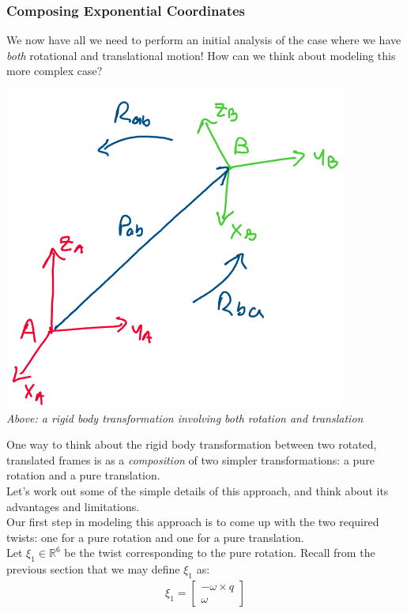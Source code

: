 \documentclass[oneside]{book}
\begin{document}
\subsubsection{Composing Exponential Coordinates}
We now have all we need to perform an initial analysis of the case where we have \textit{both} rotational and translational motion! How can we think about modeling this more complex case?
\begin{center}
    \includegraphics[scale=0.4]{images/general_rb_transf.png}\\
    \textit{Above: a rigid body transformation involving both rotation and translation}
\end{center}
One way to think about the rigid body transformation between two rotated, translated frames is as a \textit{composition} of two simpler transformations: a pure rotation and a pure translation.\\
Let's work out some of the simple details of this approach, and think about its advantages and limitations.\\
Our first step in modeling this approach is to come up with the two required twists: one for a pure rotation and one for a pure translation.\\
Let $\xi_1 \in \mathbb{R}^6$ be the twist corresponding to the pure rotation. Recall from the previous section that we may define $\xi_1$ as:
\begin{align}
    \xi_1 
    = 
    \begin{bmatrix}
        -\omega \times q\\
        \omega
    \end{bmatrix}
\end{align}
\end{document}
